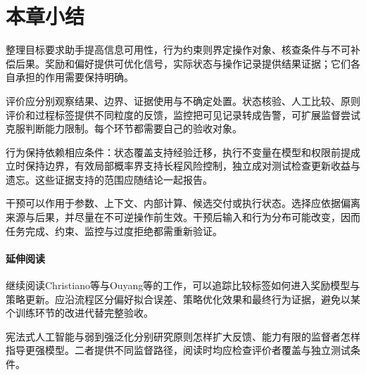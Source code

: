 \section{本章小结}
\label{sec:alignment-summary}

整理目标要求助手提高信息可用性，行为约束则界定操作对象、核查条件与不可补偿后果。奖励和偏好提供可优化信号，实际状态与操作记录提供结果证据；它们各自承担的作用需要保持明确。

评价应分别观察结果、边界、证据使用与不确定处置。状态核验、人工比较、原则评价和过程标签提供不同粒度的反馈，监控把可见记录转成告警，可扩展监督尝试克服判断能力限制。每个环节都需要自己的验收对象。

行为保持依赖相应条件：状态覆盖支持经验迁移，执行不变量在模型和权限前提成立时保持边界，有效局部概率界支持长程风险控制，独立成对测试检查更新收益与遗忘。这些证据支持的范围应随结论一起报告。

干预可以作用于参数、上下文、内部计算、候选交付或执行状态。选择应依据偏离来源与后果，并尽量在不可逆操作前生效。干预后输入和行为分布可能改变，因而任务完成、约束、监控与过度拒绝都需重新验证。

\paragraph{延伸阅读}

继续阅读Christiano等与Ouyang等的工作，可以追踪比较标签如何进入奖励模型与策略更新。应沿流程区分偏好拟合误差、策略优化效果和最终行为证据，避免以某个训练环节的改进代替完整验收。

宪法式人工智能与弱到强泛化分别研究原则怎样扩大反馈、能力有限的监督者怎样指导更强模型。二者提供不同监督路径，阅读时均应检查评价者覆盖与独立测试条件。